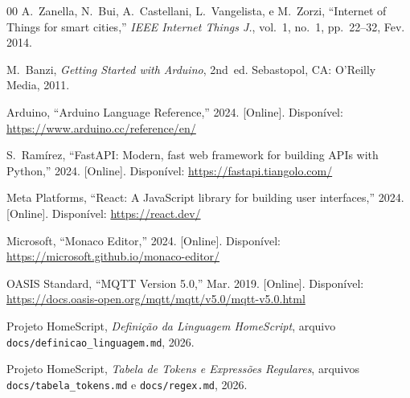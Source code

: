 \documentclass[conference]{IEEEtran}
\begin{document}
\begin{thebibliography}{00}
A.~Zanella, N.~Bui, A.~Castellani, L.~Vangelista, e M.~Zorzi,
``Internet of Things for smart cities,''
\textit{IEEE Internet Things J.}, vol.~1, no.~1, pp.~22--32, Fev. 2014.

M.~Banzi,
\textit{Getting Started with Arduino}, 2nd~ed.
Sebastopol, CA: O'Reilly Media, 2011.

Arduino,
``Arduino Language Reference,'' 2024. [Online]. Disponível:
\url{https://www.arduino.cc/reference/en/}

S.~Ramírez,
``FastAPI: Modern, fast web framework for building APIs with Python,''
2024. [Online]. Disponível: \url{https://fastapi.tiangolo.com/}

Meta Platforms,
``React: A JavaScript library for building user interfaces,''
2024. [Online]. Disponível: \url{https://react.dev/}

Microsoft,
``Monaco Editor,'' 2024. [Online]. Disponível:
\url{https://microsoft.github.io/monaco-editor/}

OASIS Standard,
``MQTT Version 5.0,'' Mar. 2019. [Online]. Disponível:
\url{https://docs.oasis-open.org/mqtt/mqtt/v5.0/mqtt-v5.0.html}

Projeto HomeScript,
\textit{Definição da Linguagem HomeScript},
arquivo \texttt{docs/definicao\_linguagem.md}, 2026.

Projeto HomeScript,
\textit{Tabela de Tokens e Expressões Regulares},
arquivos \texttt{docs/tabela\_tokens.md} e \texttt{docs/regex.md}, 2026.

\end{thebibliography}
\end{document}
